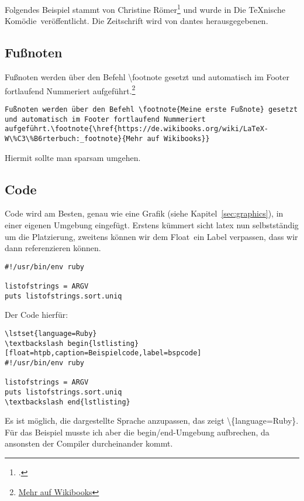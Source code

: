 
Folgendes Beispiel stammt von Christine Römer\footcite{dtk17.1:roemer:tikz} und wurde in \glqq Die \TeX{}nische Komödie\grqq\ veröffentlicht. Die Zeitschrift wird von \glspl{dante} herausgegebenen.
\subsection{Fußnoten}%
\label{sec:footn}
Fußnoten werden über den Befehl \textbackslash footnote gesetzt und automatisch im Footer fortlaufend Nummeriert aufgeführt.\footnote{\href{https://de.wikibooks.org/wiki/LaTeX-W\%C3\%B6rterbuch:_footnote}{Mehr auf Wikibooks}}
\begin{lstlisting}[float=htpb,caption=Das setzen von Fußnoten mit \protect\LaTeX{},label=lst:footnotes]
Fußnoten werden über den Befehl \footnote{Meine erste Fußnote} gesetzt und automatisch im Footer fortlaufend Nummeriert aufgeführt.\footnote{\href{https://de.wikibooks.org/wiki/LaTeX-W\%C3\%B6rterbuch:_footnote}{Mehr auf Wikibooks}}
\end{lstlisting}
Hiermit sollte man sparsam umgehen.
\subsection{Code}%
\label{sec:code}
Code wird am Besten, genau wie eine Grafik (siehe Kapitel~\ref{sec:graphics}), in einer eigenen Umgebung eingefügt. Erstens kümmert sicht \gls{latex} nun selbstständig um die Platzierung, zweitens können wir dem \glqq Float\grqq\ ein Label verpassen, dass wir dann referenzieren können.

\lstset{language=Ruby}
\begin{lstlisting}[float=htpb,caption=Beispielcode,label=bspcode]
#!/usr/bin/env ruby

listofstrings = ARGV
puts listofstrings.sort.uniq
\end{lstlisting}

Der Code hierfür:
\begin{lstlisting}[float=htpb,caption=Darstellung eines beliebigen Codes in der Sprache ruby,label=lst:ruby]
\lstset{language=Ruby}
\textbackslash begin{lstlisting}[float=htpb,caption=Beispielcode,label=bspcode]
#!/usr/bin/env ruby

listofstrings = ARGV
puts listofstrings.sort.uniq
\textbackslash end{lstlisting}
\end{lstlisting}
Es ist möglich, die dargestellte Sprache anzupassen, das zeigt \textbackslash\{language=Ruby\}. Für das Beispiel musste ich aber die begin/end-Umgebung aufbrechen, da ansonsten der Compiler durcheinander kommt.

